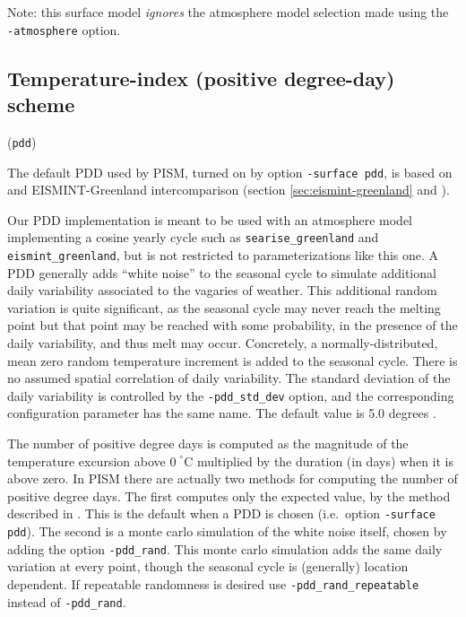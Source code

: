 \documentclass[titlepage,letterpaper,final]{scrartcl}
\newcommand{\intextoption}[1]{\texttt{-#1}\optindex{\texttt{-#1}}}
\begin{document}
Note: this surface model \emph{ignores} the atmosphere model selection made using the \texttt{-atmosphere} option.

\subsection{Temperature-index (positive degree-day) scheme}
\label{sec:temp-index-posit}

(\texttt{pdd})     

The default PDD used by PISM, turned on by option \texttt{-surface pdd}, is
based on \cite{CalovGreve05} and EISMINT-Greenland intercomparison (section
\ref{sec:eismint-greenland} and \cite{RitzEISMINT}).

Our PDD implementation is meant to be used with an atmosphere model
implementing a cosine yearly cycle such as \texttt{searise_greenland} and
\texttt{eismint_greenland}, but is not restricted to parameterizations like
this one. A PDD generally adds ``white noise'' to the seasonal cycle to
simulate additional daily variability associated to the vagaries of weather.
This additional random variation is quite significant, as the seasonal cycle
may never reach the melting point but that point may be reached with some
probability, in the presence of the daily variability, and thus melt may occur.
Concretely, a normally-distributed, mean zero random temperature increment is
added to the seasonal cycle. There is no assumed spatial correlation of daily
variability. The standard deviation of the daily variability is controlled by
the \intextoption{pdd_std_dev} option, and the corresponding configuration
parameter has the same name. The default value is 5.0 degrees
\cite{RitzEISMINT}.

The number of positive degree days is computed as the magnitude of the
temperature excursion above $0\!\phantom{|}^\circ \text{C}$ multiplied by the
duration (in days) when it is above zero. In PISM there are actually two
methods for computing the number of positive degree days. The first computes
only the expected value, by the method described in \cite{CalovGreve05}. This
is the default when a PDD is chosen (i.e.~option \texttt{-surface pdd}). The
second is a monte carlo simulation of the white noise itself, chosen by adding
the option \intextoption{pdd_rand}. This monte carlo simulation adds the same
daily variation at every point, though the seasonal cycle is (generally)
location dependent. If repeatable randomness is desired use
\intextoption{pdd_rand_repeatable} instead of \texttt{-pdd_rand}.
\end{document}
